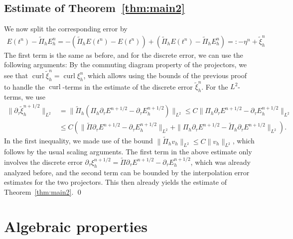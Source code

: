 \documentclass[12pt,reqno,a4paper]{amsart}
\theoremstyle{definition}
\def\dtau{\partial_{\tau}}
\def\curl{\operatorname{curl}}
\def\wPi{\widetilde\Pi}
\def\wt{\widetilde}
\begin{document}
\subsection*{Estimate of Theorem~\ref{thm:main2}}
We now split the corresponding error by 
\begin{align*}
E(t^n) - \wPi_h E_h^n = -(\wPi_h E(t^n) - E(t^n)) + (\wPi_h E(t^n) - \wPi_h E_h^n) =: -\eta^n + \wt \xi_h^n
\end{align*}
The first term is the same as before, and for the discrete error, we can use the following arguments: By the commuting diagram property of the projectors, we see that $\curl \wt \xi_h^n = \curl \xi_h^n$, which allows using the bounds of the previous proof to handle the $\curl$-terms in the estimate of the discrete error $\wt \xi_h^n$.
For the $L^2$-terms, we use 
\begin{align*}
\|\dtau \wt \xi_h^{n+1/2}\|_{L^2} 
&= \|\wPi_h(\Pi_h \dtau E^{n+1/2}-\dtau  E_h^{n+1/2})\|_{L^2}
\le C \|\Pi_h \dtau E^{n+1/2} - \dtau E_h^{n+1/2}\|_{L^2} \\
&\le C (\|\wPi \dtau E^{n+1/2} - \dtau E_h^{n+1/2}\|_{L^2} + \|\Pi_h \dtau E^{n+1/2} - \wPi_h \dtau E^{n+1/2}\|_{L^2}).
\end{align*}
In the first inequality, we made use of the bound $\|\wt \Pi_h v_h\|_{L^2} \le C \|v_h\|_{L^2}$, which follows by the usual scaling arguments. 
The first term in the above estimate only involves the discrete error $\dtau \xi_h^{n+1/2} = \wPi \dtau E^{n+1/2} - \dtau E_h^{n+1/2}$, which was already analyzed before, and the second term can be bounded by the interpolation error estimates for the two projectors.
This then already yields the estimate of Theorem~\ref{thm:main2}.
\qed


\section{Algebraic properties}\label{sec:implementation}
\end{document}
